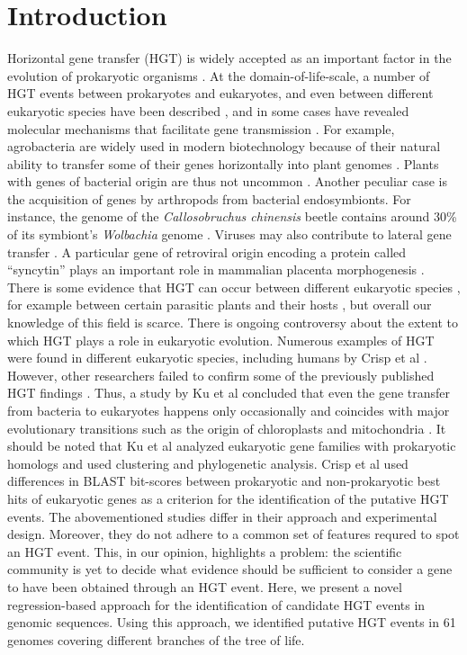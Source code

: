 \section{Introduction}
\label{intro}
Horizontal gene transfer (HGT) is widely accepted as an important factor in the
evolution of prokaryotic organisms \cite{Ochman2000}. At the
domain-of-life-scale, a number of HGT events between prokaryotes and
eukaryotes, and even between different eukaryotic species have been
described \cite{Danchin2016a},
and in some cases have revealed molecular mechanisms that
facilitate gene transmission \cite{Soucy2015}. For example, agrobacteria are
widely used in modern biotechnology because of their natural ability to
transfer some of their genes horizontally into plant genomes
\cite{Chilton1977}. Plants with genes of bacterial origin are thus not uncommon
\cite{Kyndt2015} \cite{Matveeva2012} \cite{Matveeva2014}. Another peculiar case is the
acquisition of genes by arthropods from bacterial endosymbionts. For instance,
the genome of the \textit{Callosobruchus chinensis} beetle contains around 30\%
of its symbiont's \textit{Wolbachia} genome \cite{Nikoh2008}. Viruses may also
contribute to lateral gene transfer \cite{Drezen2017}. A particular gene of
retroviral origin encoding a protein called ``syncytin'' plays an important
role in mammalian placenta morphogenesis \cite{Mi2000}. There is some evidence
that HGT can occur between different eukaryotic species \cite{Soucy2015}, for
example between certain parasitic plants and their hosts \cite{Yoshida2010}
\cite{Xi2012} \cite{Zhang2013} \cite{Zhang2014}, but overall our knowledge of this field is
scarce. There is ongoing controversy about the extent to which HGT plays a role
in eukaryotic evolution. Numerous examples of HGT were found in different
eukaryotic species, including humans by Crisp et al \cite{Crisp2015}. However,
other researchers failed to confirm some of the previously published HGT
findings \cite{Salzberg2017}. Thus, a study by Ku et al concluded that even the
gene transfer from bacteria to eukaryotes happens only occasionally and
coincides with major evolutionary transitions such as the origin of
chloroplasts and mitochondria \cite{Ku2015}. It should be noted that Ku et al
analyzed eukaryotic gene families with prokaryotic homologs and used clustering
and phylogenetic analysis. Crisp et al used differences in BLAST bit-scores
between prokaryotic and non-prokaryotic best hits of eukaryotic genes as a
criterion for the identification of the putative HGT events. The abovementioned
studies differ in their approach and experimental design. Moreover, they do not
adhere to a common set of features requred to spot an HGT event. This, in our
opinion, highlights a problem: the scientific community is yet to decide what
evidence should be sufficient to consider a gene to have been obtained through
an HGT event. Here, we present a novel regression-based approach for the
identification of candidate HGT events in genomic sequences. Using this
approach, we identified putative HGT events in 61 genomes covering different
branches of the tree of life.
